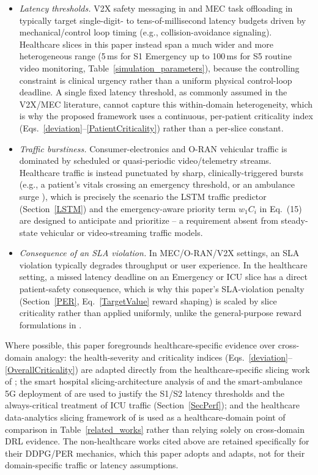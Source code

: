 \documentclass[10pt,journal,compsoc]{IEEEtran}
\begin{document}
\begin{itemize}
\item \textit{Latency thresholds.} V2X safety messaging in \cite{tariq2025ddpgv2x}
and MEC task offloading in \cite{yang2025ddpg} typically target single-digit- to
tens-of-millisecond latency budgets driven by mechanical/control loop timing
(e.g., collision-avoidance signaling). Healthcare slices in this paper instead
span a much wider and more heterogeneous range (5\,ms for S1 Emergency up to
100\,ms for S5 routine video monitoring, Table~\ref{simulation_parameters}),
because the controlling constraint is clinical urgency rather than a uniform
physical control-loop deadline. A single fixed latency threshold, as commonly
assumed in the V2X/MEC literature, cannot capture this within-domain
heterogeneity, which is why the proposed framework uses a continuous,
per-patient criticality index (Eqs.~\eqref{deviation}--\eqref{PatientCriticality})
rather than a per-slice constant.
\item \textit{Traffic burstiness.} Consumer-electronics and O-RAN vehicular
traffic \cite{shah2025oran,zheng2025eamem} is dominated by scheduled or
quasi-periodic video/telemetry streams. Healthcare traffic is instead
punctuated by sharp, clinically-triggered bursts (e.g., a patient's vitals
crossing an emergency threshold, or an ambulance surge \cite{zhai2021ambulance}),
which is precisely the scenario the LSTM traffic predictor (Section~\ref{LSTM})
and the emergency-aware priority term $w_1 C_i$ in Eq.~(15) are designed to
anticipate and prioritize -- a requirement absent from steady-state vehicular
or video-streaming traffic models.
\item \textit{Consequence of an SLA violation.} In MEC/O-RAN/V2X settings, an SLA
violation typically degrades throughput or user experience. In the healthcare
setting, a missed latency deadline on an Emergency or ICU slice has a direct
patient-safety consequence, which is why this paper's SLA-violation penalty
(Section~\ref{PER}, Eq.~\ref{TargetValue} reward shaping) is scaled by slice
criticality rather than applied uniformly, unlike the general-purpose reward
formulations in \cite{tariq2025ddpgv2x,yang2025ddpg}.
\end{itemize}
 
Where possible, this paper foregrounds healthcare-specific evidence over
cross-domain analogy: the health-severity and criticality indices
(Eqs.~\eqref{deviation}--\eqref{OverallCriticality}) are adapted directly from
the healthcare-specific slicing work of \cite{basu2022softhealth}; the smart
hospital slicing-architecture analysis of \cite{wijethilaka2022hospital} and
the smart-ambulance 5G deployment of \cite{zhai2021ambulance} are used to
justify the S1/S2 latency thresholds and the always-critical treatment of ICU
traffic (Section~\ref{SecPerf}); and the healthcare data-analytics slicing
framework of \cite{gollavilli2024healthcare} is used as a healthcare-domain
point of comparison in Table~\ref{related_works} rather than relying solely on
cross-domain DRL evidence. The non-healthcare works cited above are retained
specifically for their DDPG/PER mechanics, which this paper adopts and adapts,
not for their domain-specific traffic or latency assumptions.
 
\end{document}
